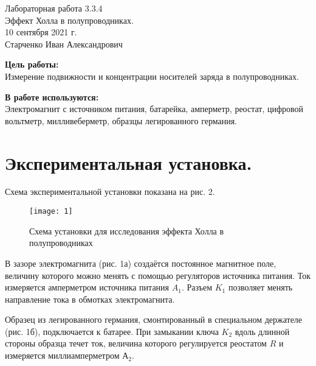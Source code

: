 




\setcounter{page}{1}



\begin{center}
  \LARGE{Лабораторная работа 3.3.4}\\[0.2cm]
  \LARGE{Эффект Холла в полупроводниках.}\\[0.2cm]
  \large{10 сентября 2021 г.}\\[0.2cm]
  \large{Старченко Иван Александрович}\\[0.2cm]
\end{center}

\textbf{Цель работы:} \\
Измерение подвижности и концентрации носителей заряда в полупроводниках.

\textbf{В работе используются:} \\
Электромагнит с источником питания, батарейка, амперметр, реостат, цифровой вольтметр, милливеберметр, образцы легированного германия.
 


	\section{Экспериментальная установка.}
	Схема экспериментальной установки показана на рис. 2.
	
	\begin{figure}[h!]
		\centering
		\texttt{[image: 1]}
		\caption{Схема установки для исследования эффекта Холла в полупроводниках}
		\label{fig:Holl2}
	\end{figure}
  
  	В зазоре электромагнита (рис. 1а) создаётся постоянное магнитное поле, величину которого можно менять с помощью регуляторов источника питания. Ток измеряется амперметром источника питания $A_{1}$. Разъем $K_{1}$ позволяет менять направление тока в обмотках электромагнита.
  
  	Образец из легированного германия, смонтированный в специальном держателе (рис. 1б), подключается к батарее. При замыкании ключа $K_{2}$ вдоль длинной стороны образца течет ток, величина которого регулируется реостатом $R$ и измеряется миллиамперметром $А_{2}$.
  	
